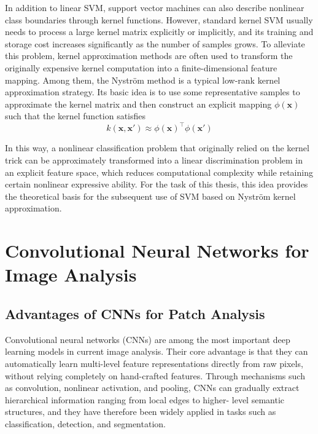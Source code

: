 \par In addition to linear SVM, support vector machines can also describe
nonlinear class boundaries through kernel functions. However, standard kernel
SVM usually needs to process a large kernel matrix explicitly or implicitly,
and its training and storage cost increases significantly as the number of
samples grows. To alleviate this problem, kernel approximation methods are
often used to transform the originally expensive kernel computation into a
finite-dimensional feature mapping. Among them, the Nystr\"{o}m method is a
typical low-rank kernel approximation strategy. Its basic idea is to use some
representative samples to approximate the kernel matrix and then construct an
explicit mapping $\phi(\mathbf{x})$ such that the kernel function satisfies
\begin{equation}
    k(\mathbf{x},\mathbf{x}')\approx \phi(\mathbf{x})^\top\phi(\mathbf{x}')
    \label{eq:nystrom-basic}
\end{equation}
\par In this way, a nonlinear classification problem that originally relied on
the kernel trick can be approximately transformed into a linear discrimination
problem in an explicit feature space, which reduces computational complexity
while retaining certain nonlinear expressive ability. For the task of this
thesis, this idea provides the theoretical basis for the subsequent use of SVM
based on Nystr\"{o}m kernel approximation.

\section{Convolutional Neural Networks for Image Analysis}
\subsection{Advantages of CNNs for Patch Analysis}
\par Convolutional neural networks (CNNs)
\cite{lecun2002gradient,krizhevsky2012imagenet} are among the most important
deep learning models in current image analysis. Their core advantage is that
they can automatically learn multi-level feature representations directly from
raw pixels, without relying completely on hand-crafted features. Through
mechanisms such as convolution, nonlinear activation, and pooling, CNNs can
gradually extract hierarchical information ranging from local edges to higher-
level semantic structures, and they have therefore been widely applied in tasks
such as classification, detection, and segmentation.

